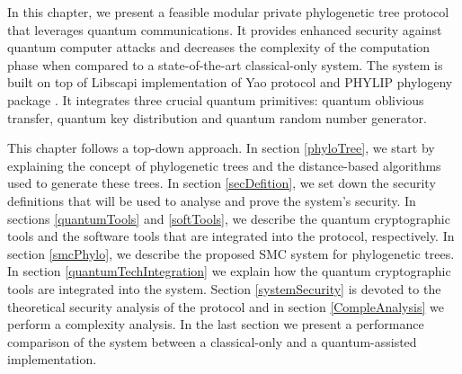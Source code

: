 

In this chapter, we present a feasible modular private phylogenetic tree protocol that leverages quantum communications. It provides enhanced security against quantum computer attacks and decreases the complexity of the computation phase when compared to a state-of-the-art classical-only system. 
The system is built on top of Libscapi \cite{libscapi} implementation of Yao protocol and PHYLIP phylogeny package \cite{PH78}. It integrates three crucial quantum primitives: quantum oblivious transfer, quantum key distribution and quantum random number generator.

This chapter follows a top-down approach. In section \ref{phyloTree}, we start by explaining the concept of phylogenetic trees and the distance-based algorithms used to generate these trees. In section \ref{secDefition}, we set down the security definitions that will be used to analyse and prove the system's security. %
In sections \ref{quantumTools} and \ref{softTools}, we describe the quantum cryptographic tools and the software tools that are integrated into the protocol, respectively. In section \ref{smcPhylo}, we describe the proposed SMC system for phylogenetic trees. In section \ref{quantumTechIntegration} we explain how the quantum cryptographic tools are integrated into the system. Section \ref{systemSecurity} is devoted to the theoretical security analysis of the protocol and in section \ref{CompleAnalysis} we perform a complexity analysis. In the last section we present a performance comparison of the system between a classical-only and a quantum-assisted implementation.



